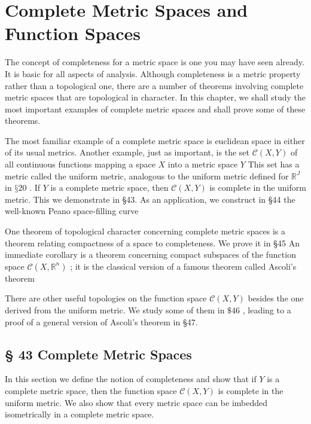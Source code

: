 \chapter{Complete Metric Spaces and Function Spaces}

The concept of completeness for a metric space is one you may have seen already. It is basic for all aspects of analysis. Although completeness is a metric property rather than a topological one, there are a number of theorems involving complete metric spaces that are topological in character. In this chapter, we shall study the most important examples of complete metric spaces and shall prove some of these theorems.

The most familiar example of a complete metric space is euclidean space in either of its usual metrics. Another example, just as important, is the set \(\mathcal{C}\left( {X,Y}\right)\) of all continuous functions mapping a space \(X\) into a metric space \(Y\) This set has a metric called the uniform metric, analogous to the uniform metric defined for \({\mathbb{R}}^{J}\) in \(§{20}\) . If \(Y\) is a complete metric space, then \(\mathcal{C}\left( {X,Y}\right)\) is complete in the uniform metric. This we demonstrate in §43. As an application, we construct in §44 the well-known Peano space-filling curve

One theorem of topological character concerning complete metric spaces is a theorem relating compactness of a space to completeness. We prove it in §45 An immediate corollary is a theorem concerning compact subspaces of the function space \(\mathcal{C}\left( {X,{\mathbb{R}}^{n}}\right)\) ; it is the classical version of a famous theorem called Ascoli’s theorem

There are other useful topologies on the function space \(\mathcal{C}\left( {X,Y}\right)\) besides the one derived from the uniform metric. We study some of them in \(\$ {46}\) , leading to a proof of a general version of Ascoli’s theorem in §47.

\section*{§ 43 Complete Metric Spaces}

In this section we define the notion of completeness and show that if \(Y\) is a complete metric space, then the function space \(\mathcal{C}\left( {X,Y}\right)\) is complete in the uniform metric. We also show that every metric space can be imbedded isometrically in a complete metric space.

